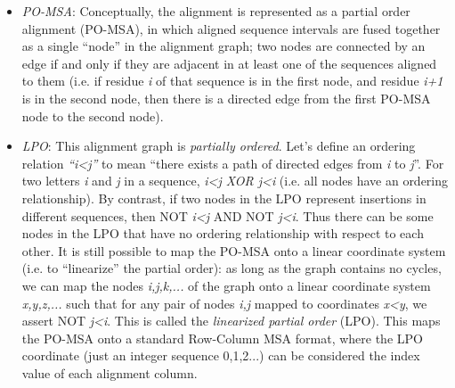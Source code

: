 \documentclass{howto}
\begin{document}
\begin{itemize}

\item
{\em PO-MSA}: Conceptually, the alignment is represented as a partial order alignment
(PO-MSA), in which aligned sequence intervals are fused together as a single
``node'' in the alignment graph; two nodes are connected by an edge if and only
if they are adjacent in at least one of the sequences aligned to them
(i.e. if residue {\em i} of that sequence is in the first node, and 
residue {\em i+1} is in the second node, then there is a directed edge
from the first PO-MSA node to the second node).

\item
{\em LPO}: This alignment graph is {\em partially ordered}.  Let's define an
ordering relation {\em ``i<j''} to mean ``there exists a path
of directed edges from {\em i} to {\em j}''.  For two 
letters {\em i} and {\em j} in a sequence, {\em i<j XOR j<i} (i.e. all
nodes have an ordering relationship).  By contrast, if two nodes in the LPO
represent insertions in different sequences, then NOT {\em i<j} AND NOT {\em j<i}.
Thus there can be some nodes in the LPO that have no ordering relationship
with respect to each other.  It is still possible to map the PO-MSA onto 
a linear coordinate system (i.e. to ``linearize'' the partial order): as long
as the graph contains no cycles, we can map the nodes {\em i,j,k,...} of the graph
onto a linear coordinate system {\em x,y,z,...} such that for any pair of
nodes {\em i,j} mapped to coordinates {\em x<y}, we assert NOT {\em j<i}.  This is
called the {\em linearized partial order} (LPO). This maps the PO-MSA onto
a standard Row-Column MSA format, where the LPO coordinate (just an integer
sequence 0,1,2...) can be considered the index value of each alignment column.


\end{itemize}
\end{document}
